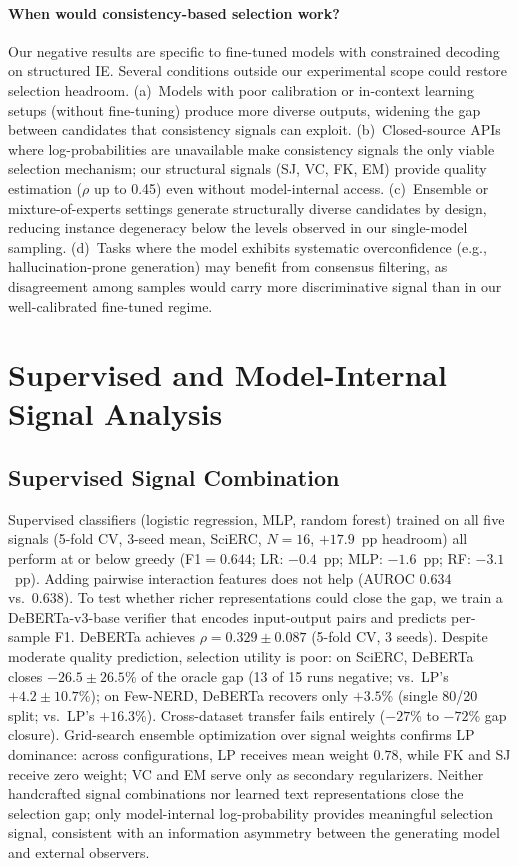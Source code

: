 \paragraph{When would consistency-based selection work?}\label{app:when_selection_works}
Our negative results are specific to fine-tuned models with constrained decoding on structured IE. Several conditions outside our experimental scope could restore selection headroom.
(a)~Models with poor calibration or in-context learning setups (without fine-tuning) produce more diverse outputs, widening the gap between candidates that consistency signals can exploit.
(b)~Closed-source APIs where log-probabilities are unavailable make consistency signals the only viable selection mechanism; our structural signals (SJ, VC, FK, EM) provide quality estimation ($\rho$ up to 0.45) even without model-internal access.
(c)~Ensemble or mixture-of-experts settings generate structurally diverse candidates by design, reducing instance degeneracy below the levels observed in our single-model sampling.
(d)~Tasks where the model exhibits systematic overconfidence (e.g., hallucination-prone generation) may benefit from consensus filtering, as disagreement among samples would carry more discriminative signal than in our well-calibrated fine-tuned regime.

\section{Supervised and Model-Internal Signal Analysis}\label{app:supervised_combination}

\subsection{Supervised Signal Combination}

Supervised classifiers (logistic regression, MLP, random forest) trained on all five signals (5-fold CV, 3-seed mean, SciERC, $N{=}16$, $+17.9$~pp headroom) all perform at or below greedy (F1${=}0.644$; LR: $-0.4$~pp; MLP: $-1.6$~pp; RF: $-3.1$~pp).
Adding pairwise interaction features does not help (AUROC 0.634 vs.\ 0.638).
To test whether richer representations could close the gap, we train a DeBERTa-v3-base verifier that encodes input-output pairs and predicts per-sample F1.
DeBERTa achieves $\rho{=}0.329{\pm}0.087$ (5-fold CV, 3 seeds). Despite moderate quality prediction, selection utility is poor: on SciERC, DeBERTa closes $-26.5{\pm}26.5$\% of the oracle gap (13 of 15 runs negative; vs.\ LP's $+4.2{\pm}10.7$\%); on Few-NERD, DeBERTa recovers only $+3.5$\% (single 80/20 split; vs.\ LP's $+16.3$\%).
Cross-dataset transfer fails entirely ($-27$\% to $-72$\% gap closure).
Grid-search ensemble optimization over signal weights confirms LP dominance: across configurations, LP receives mean weight $0.78$, while FK and SJ receive zero weight; VC and EM serve only as secondary regularizers.
Neither handcrafted signal combinations nor learned text representations close the selection gap; only model-internal log-probability provides meaningful selection signal, consistent with an information asymmetry between the generating model and external observers.

